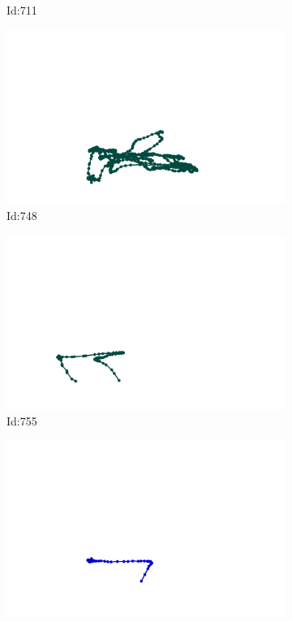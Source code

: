 \documentclass[12pt,twoside]{report}
\begin{document}
\begin{figure}
\begin{subfigure}[b]{0.20\textwidth}
\caption{Id:711}
\end{subfigure}
\begin{subfigure}[b]{0.20\textwidth}
\centering
\includegraphics[width=\textwidth]{../trajectories/748.png}
\caption{Id:748}
\end{subfigure}
\begin{subfigure}[b]{0.20\textwidth}
\centering
\includegraphics[width=\textwidth]{../trajectories/755.png}
\caption{Id:755}
\end{subfigure}
\begin{subfigure}[b]{0.20\textwidth}
\centering
\includegraphics[width=\textwidth]{../trajectories/756.png}

\end{subfigure}
\end{figure}
\end{document}
